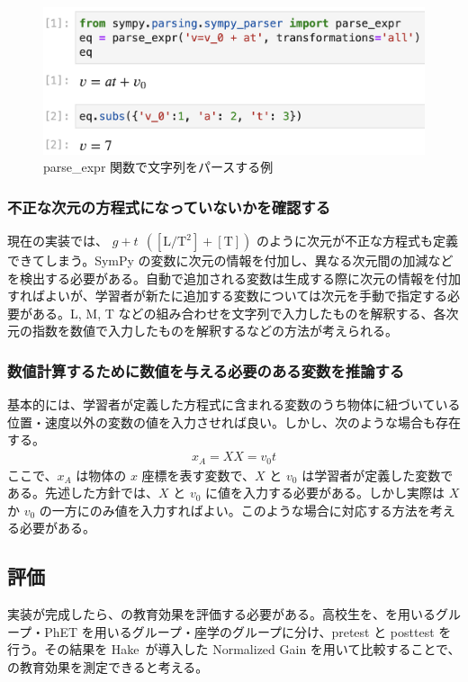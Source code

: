 \begin{figure}[htb]
  \centering
  \includegraphics[width=0.9\linewidth]{work/example_parse.png}
  \caption{parse\_expr 関数で文字列をパースする例} \label{example_parse}
\end{figure}

\subsubsection*{不正な次元の方程式になっていないかを確認する}
現在の実装では、 $g + t~~\mathrm{([L/T^2] + [T])}$ のように次元が不正な方程式も定義できてしまう。SymPy の変数に次元の情報を付加し、異なる次元間の加減などを検出する必要がある。自動で追加される変数は生成する際に次元の情報を付加すればよいが、学習者が新たに追加する変数については次元を手動で指定する必要がある。L, M, T などの組み合わせを文字列で入力したものを解釈する、各次元の指数を数値で入力したものを解釈するなどの方法が考えられる。

\subsubsection*{数値計算するために数値を与える必要のある変数を推論する}
基本的には、学習者が定義した方程式に含まれる変数のうち物体に紐づいている位置・速度以外の変数の値を入力させれば良い。しかし、次のような場合も存在する。
\begin{align*}
x_A = X
X = v_0t
\end{align*}
ここで、$x_A$ は物体の $x$ 座標を表す変数で、$X$ と $v_0$ は学習者が定義した変数である。先述した方針では、$X$ と $v_0$ に値を入力する必要がある。しかし実際は $X$ か $v_0$ の一方にのみ値を入力すればよい。このような場合に対応する方法を考える必要がある。

\subsection{評価}

実装が完成したら、\simname の教育効果を評価する必要がある。高校生を、\simname を用いるグループ・PhET を用いるグループ・座学のグループに分け、pretest と posttest を行う。その結果を Hake~\cite{hake_1998}が導入した Normalized Gain を用いて比較することで、\simname の教育効果を測定できると考える。

